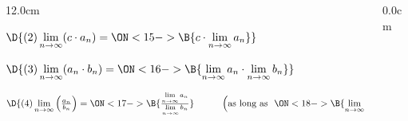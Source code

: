 \begin{frame}
\begin{columns}
\begin{column}{12.0cm}
\vspace{0.2cm}

$\D{
(2) \lim \limits_{n \to \infty} (c \cdot a_n) = 
\ON<15->{\B{c \cdot \lim \limits_{n \to \infty} a_n}}}$

\vspace{0.2cm}

$\D{
(3) \lim \limits_{n \to \infty} (a_n \cdot b_n) = 
\ON<16->{\B{\lim \limits_{n \to \infty} a_n \cdot \lim \limits_{n \to \infty} b_n}}}$

$\D{
(4) \lim \limits_{n \to \infty} \left(\frac{a_n}{b_n}\right) = 
\ON<17->{\B{\frac{\lim \limits_{n \to \infty} a_n}{\lim \limits_{n \to \infty} b_n}}} \hspace{1.0cm} \left(\text{as long as } \,\, 
\ON<18->{\B{\lim \limits_{n \to \infty} b_n \ne 0}}\right)}$

\vspace{0.5cm}


\end{column}
\begin{column}{0.0cm}\end{column}
\end{columns}
\end{frame}

%
%
%
%
%
%
%	

